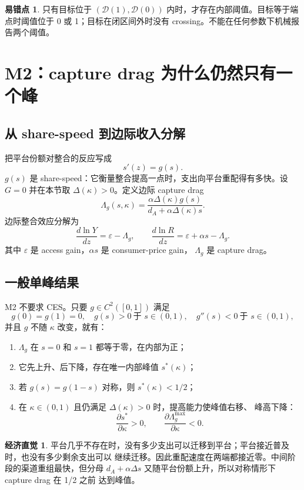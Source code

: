 \documentclass[UTF8,11pt,scheme=chinese,fontset=windows]{ctexart}
\newcommand{\calD}{\mathcal D}
\theoremstyle{definition}
\newtheorem{intuition}{经济直觉}[section]
\newtheorem{commonerror}{易错点}[section]
\begin{document}
\begin{commonerror}
只有目标位于 \((\calD(1),\calD(0))\) 内时，才存在内部阈值。目标等于端点时阈值位于
0 或 1；目标在闭区间外时没有 crossing。不能在任何参数下机械报告两个阈值。
\end{commonerror}

\section{M2：capture drag 为什么仍然只有一个峰}

\subsection{从 share-speed 到边际收入分解}

把平台份额对整合的反应写成
\[
s'(z)=g(s).
\]
\(g(s)\) 是 share-speed：它衡量整合提高一点时，支出向平台重配得有多快。设
\(G=0\) 并在本节取 \(\Delta(\kappa)>0\)。定义边际 capture drag
\[
\boxed{
\Lambda_g(s,\kappa)=
\frac{\alpha\Delta(\kappa)g(s)}
{d_A+\alpha\Delta(\kappa)s}.}
\]
边际整合效应分解为
\[
\boxed{
\frac{d\ln Y}{dz}=\varepsilon-\Lambda_g,
\qquad
\frac{d\ln R}{dz}=\varepsilon+\alpha s-\Lambda_g.}
\]
其中 \(\varepsilon\) 是 access gain，\(\alpha s\) 是 consumer-price gain，
\(\Lambda_g\) 是 capture drag。

\subsection{一般单峰结果}

M2 不要求 CES。只要 \(g\in C^2([0,1])\) 满足
\[
g(0)=g(1)=0,
\quad g(s)>0\ \text{于 }s\in(0,1),
\quad g''(s)<0\ \text{于 }s\in(0,1),
\]
并且 \(g\) 不随 \(\kappa\) 改变，就有：
\begin{enumerate}
  \item \(\Lambda_g\) 在 \(s=0\) 和 \(s=1\) 都等于零，在内部为正；
  \item 它先上升、后下降，存在唯一内部峰值 \(s^*(\kappa)\)；
  \item 若 \(g(s)=g(1-s)\) 对称，则 \(s^*(\kappa)<1/2\)；
  \item 在 \(\kappa\in(0,1)\) 且仍满足 \(\Delta(\kappa)>0\) 时，提高能力使峰值右移、
  峰高下降：
  \[
  \frac{\partial s^*}{\partial\kappa}>0,
  \qquad
  \frac{\partial\Lambda_g^{\max}}{\partial\kappa}<0.
  \]
\end{enumerate}

\begin{intuition}
平台几乎不存在时，没有多少支出可以迁移到平台；平台接近普及时，也没有多少剩余支出可以
继续迁移。因此重配速度在两端都接近零。中间阶段的渠道重组最快，但分母
\(d_A+\alpha\Delta s\) 又随平台份额上升，所以对称情形下 capture drag 在 1/2 之前
达到峰值。
\end{intuition}
\end{document}
